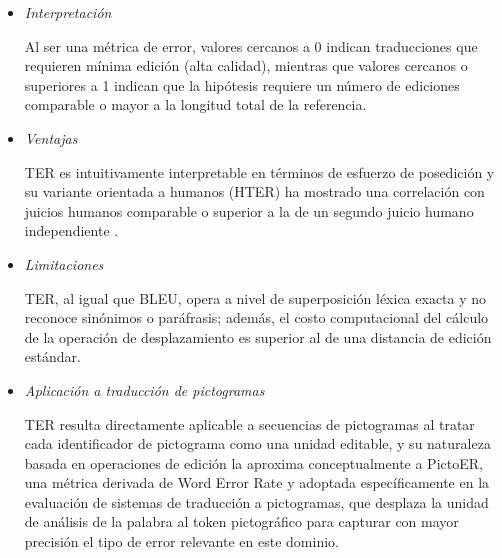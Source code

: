 \begin{itemize}
Con el mismo par (referencia de 6 palabras, hipótesis con una sustitución: ``en'' por ``sobre''), se requiere una única operación de edición (sustitución) para transformar la hipótesis en la referencia. Por lo tanto:

\begin{equation}
\text{TER} = \frac{1}{6} \approx 0.167 \; (16.7\%)
\end{equation}

lo que indica que, en promedio, un 16.7\% de las palabras de la referencia requirieron edición para reconstruirse a partir de la hipótesis.

\item \textit{Interpretación} \\
\vspace{-0.5cm}

Al ser una métrica de error, valores cercanos a 0 indican traducciones que requieren mínima edición (alta calidad), mientras que valores cercanos o superiores a 1 indican que la hipótesis requiere un número de ediciones comparable o mayor a la longitud total de la referencia.

\item \textit{Ventajas} \\
\vspace{-0.5cm}

TER es intuitivamente interpretable en términos de esfuerzo de posedición y su variante orientada a humanos (HTER) ha mostrado una correlación con juicios humanos comparable o superior a la de un segundo juicio humano independiente \cite{snover2006ter}.

\item \textit{Limitaciones} \\
\vspace{-0.5cm}

TER, al igual que BLEU, opera a nivel de superposición léxica exacta y no reconoce sinónimos o paráfrasis; además, el costo computacional del cálculo de la operación de desplazamiento es superior al de una distancia de edición estándar.


\item \textit{Aplicación a traducción de pictogramas}


TER resulta directamente aplicable a secuencias de pictogramas al tratar cada identificador de pictograma como una unidad editable, y su naturaleza basada en operaciones de edición la aproxima conceptualmente a PictoER, una métrica derivada de Word Error Rate y adoptada específicamente en la evaluación de sistemas de traducción a pictogramas, que desplaza la unidad de análisis de la palabra al token pictográfico para capturar con mayor precisión el tipo de error relevante en este dominio.
\end{itemize}


